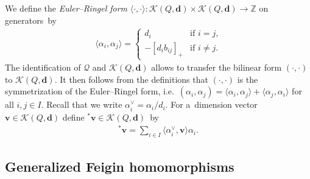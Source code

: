 \documentclass[11pt]{article}
\numberwithin{equation}{section}
\begin{document}
We def\/ine the \emph{Euler--Ringel form}
$\langle\cdot,\cdot\rangle:
\mathcal{K}(Q,\mathbf{d})\times\mathcal{K}(Q,\mathbf{d})\to\mathbb{Z}$ on generators~by
\begin{gather*}
\langle\alpha_i,\alpha_j\rangle=
\begin{cases}
d_i & \text{if $i=j$,}
\\
-[d_ib_{ij}]_+ & \text{if $i\ne j$.}
\end{cases}
\end{gather*}
The identif\/ication of $\mathcal{Q}$ and $\mathcal{K}(Q,\mathbf{d})$ allows to transfer the bilinear form $(\cdot,\cdot)$
to $\mathcal{K}(Q,\mathbf{d})$.
It then follows from the def\/initions that $(\cdot,\cdot)$ is the symmetrization of the Euler--Ringel form, %
i.e.~$(\alpha_i,\alpha_j)=\langle\alpha_i,\alpha_j\rangle+\langle\alpha_j,\alpha_i\rangle$ for all $i,j\in I$.
Recall that we write $\alpha_i^\vee=\alpha_i/d_i$.
For a~dimension vector $\mathbf{v}\in\mathcal{K}(Q,\mathbf{d})$ def\/ine ${}^*\mathbf{v}\in\mathcal{K}(Q,\mathbf{d})$~by
\begin{gather*}
{}^*\mathbf{v}=\sum\limits_{i\in I}\langle\alpha_i^\vee,\mathbf{v}\rangle\alpha_i.
\end{gather*}
\setcounter{section}{5}
\setcounter{subsection}{0}
\setcounter{subsubsection}{0}
\setcounter{Theorem}{2}
\setcounter{equation}{0}
\subsection{Generalized Feigin homomorphisms}
\label{subsec:hall_gen_feigin}
\end{document}
